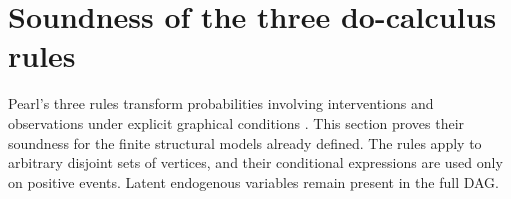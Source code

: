 \section{Soundness of the three do-calculus rules}
\label{sec:p16-do-calculus-soundness}

Pearl's three rules transform probabilities involving interventions and
observations under explicit graphical conditions
\cite[Theorem~3, pp.~676--678; Appendix, pp.~686--687]{Pearl1995CausalDiagrams}.
This section proves their soundness for the finite structural models
already defined. The rules apply to arbitrary disjoint sets of vertices,
and their conditional expressions are used only on positive events.
Latent endogenous variables remain present in the full DAG.

